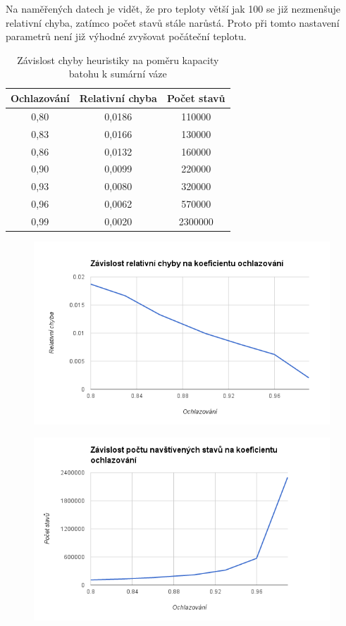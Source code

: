 \documentclass[10pt,a4paper]{article}
\begin{document}
Na naměřených datech je vidět, že pro teploty větší jak 100 se již nezmenšuje relativní chyba, zatímco počet stavů stále narůstá. Proto při tomto nastavení parametrů není již výhodné zvyšovat počáteční teplotu.

\begin{table}[H]
\centering
  \begin{tabular}{ |c|c|c|}
  \hline
  Ochlazování & Relativní chyba & Počet stavů \\
  \hline
  0,80 & 0,0186 & 110000 \\
  0,83 & 0,0166 & 130000 \\
  0,86 & 0,0132 & 160000 \\ 
  0,90 & 0,0099 & 220000 \\
  0,93 & 0,0080 & 320000 \\
  0,96 & 0,0062 & 570000 \\    
  0,99 & 0,0020 & 2300000 \\  
  \hline
  \end{tabular}
  \caption{Závislost chyby heuristiky na poměru kapacity batohu k sumární váze}
\end{table}

\begin{figure}[H]\centering
 \includegraphics[width=0.99\textwidth]{3}
\end{figure}

\begin{figure}[H]\centering
 \includegraphics[width=0.99\textwidth]{4}
\end{figure}
\end{document}
